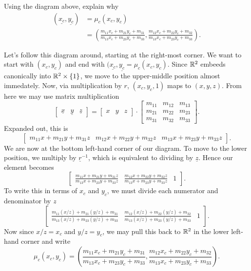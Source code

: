 \documentclass{ximera}
\begin{document}
\begin{problem}
  Using the diagram above, explain why
  \begin{align*}
(\underline{x_{c}},\underline{y_{c}})  &= \mu_{c}(x_{c},y_{c}) \\
  & =\left(\frac{m_{11}x_{c}+m_{21}y_{c}+m_{31}}{m_{13}x_{c}+m_{23}y_{c}+m_{33}},
  \frac{m_{12}x_{c}+m_{22}y_{c}+m_{32}}{m_{13}x_{c}+m_{23}y_{c}+m_{33}
}\right).
  \end{align*}
  \begin{freeResponse}
    Let's follow this diagram around, starting at the right-most
    corner. We want to start with $(x_c,y_c)$ and end with
    $(\underline{x_c},\underline{y_c} = \mu_c(x_c,y_c)$. Since $\mathbb R^2$
    embeeds canonically into $\mathbb R^2\times\{1\}$, we move to the
    upper-middle position almost immedately. Now, via multiplication
    by $r$, $(x_c,y_c,1)$ maps to $(x,y,z)$. From here we may use
    matrix multiplication
    \[
    \begin{bmatrix}
      \underline{x} & \underline{y} & \underline{z}
    \end{bmatrix}
    =
    \begin{bmatrix}
    x & y & z
    \end{bmatrix}
    \cdot\begin{bmatrix}
    m_{11} & m_{12} & m_{13}\\
    m_{21} & m_{22} & m_{23}\\
    m_{31} & m_{32} & m_{33}
    \end{bmatrix}.
    \]
    Expanded out, this is
    \[
    \begin{bmatrix}
      m_{11}x+m_{21}y+m_{31}z & m_{12}x+m_{22}y+m_{32}z & 
      m_{13}x+m_{23}y+m_{33}z
    \end{bmatrix}.
    \]
    We are now at the bottom left-hand corner of our diagram. To move
    to the lower position, we multiply by $\underline{r}^{-1}$, which
    is equivalent to dividing by $\underline{z}$. Hence our element
    becomes
     \[
    \begin{bmatrix}
      \frac{m_{11}x+m_{21}y+m_{31}z}{m_{13}x+m_{23}y+m_{33}z} &
      \frac{m_{12}x+m_{22}y+m_{32}z}{m_{13}x+m_{23}y+m_{33}z} & 1
    \end{bmatrix}.
    \]
    To write this in terms of $x_c$ and $y_c$, we must divide each
    numerator and denominator by $z$
    \[
    \begin{bmatrix}
      \frac{m_{11}(x/z)+m_{21}(y/z)+m_{31}}{m_{13}(x/z)+m_{23}(y/z)+m_{33}}
      &
      \frac{m_{12}(x/z)+m_{22}(y/z)+m_{32}}{m_{13}(x/z)+m_{23}(y/z)+m_{33}}
      & 1
    \end{bmatrix}.
    \]
    Now since $x/z = x_c$ and $y/z =y_c$, we may pull this back to
    $\mathbb R^2$ in the lower left-hand corner and write
    \[
    \mu_c(x_c,y_c) = \left(
    \frac{m_{11}x_c+m_{21}y_c+m_{31}}{m_{13}x_c+m_{23}y_c+m_{33}},
    \frac{m_{12}x_c+m_{22}y_c+m_{32}}{m_{13}x_c+m_{23}y_c+m_{33}}
    \right).
    \]
  \end{freeResponse}
\end{problem}
\end{document}
